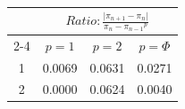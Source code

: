 \documentclass{article}
\providecommand{\abs}[1]{\lvert#1\rvert}
\begin{document}
\begin{tabular}{|c|c|c|c|}
\hline
\n & \multicolumn{3}{|c|}{$Ratio:\displaystyle\frac{\abs{\pi_{n+1}-\pi_{n}}}{{\pi_{n}-\pi_{n-1}}^p}$} \\
\cline{2-4}
 & $p=1$ & $p=2$ & $p=\Phi$ \\
\hline
 1 & 0.0069 & 0.0631 & 0.0271 \\ 
  2 & 0.0000 & 0.0624 & 0.0040 \\ 
 \hline 
\end{tabular}
\end{document}
